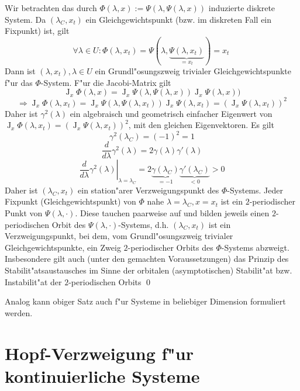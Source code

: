 \documentclass[a4paper, 13pt]{scrreprt}
\theoremstyle{definition} \newtheorem{definition}{Definition}[section]
\newenvironment{beweis}[1][Beweis]{\begin{trivlist}
\item[\hskip \labelsep {\bfseries #1}]}{\end{trivlist}}
\begin{document}
\begin{beweis}
Wir betrachten das durch $\Phi(\lambda,x):=\Psi(\lambda,\Psi(\lambda,x))$ induzierte diskrete System. Da $(\lambda_C, x_t)$ ein Gleichgewichtspunkt (bzw. im diskreten Fall ein Fixpunkt) ist, gilt
\[\forall\lambda\in U: \Phi(\lambda,x_t)=\Psi(\lambda,\underbrace{\Psi(\lambda,x_t)}_{=x_t})=x_t\ \]
Dann ist $(\lambda,x_t), \lambda\in U$ ein Grundl"osungszweig trivialer Gleichgewichtspunkte f"ur das $\Phi$-System. F"ur die Jacobi-Matrix gilt
\[\operatorname{J}_x\Phi(\lambda,x)=\operatorname{J}_x\Psi(\lambda,\Psi(\lambda,x))\operatorname{J}_x\Psi(\lambda,x))\]
\[\Rightarrow \operatorname{J}_x\Phi(\lambda,x_t)=\operatorname{J}_x\Psi(\lambda,\Psi(\lambda,x_t))\operatorname{J}_x\Psi(\lambda,x_t)=(\operatorname{J}_x\Psi(\lambda,x_t))^2\]
Daher ist $\gamma^2(\lambda)$ ein algebraisch und geometrisch einfacher Eigenwert von $\operatorname{J}_x\Phi(\lambda,x_t)=(\operatorname{J}_x\Psi(\lambda,x_t))^2$, mit den gleichen Eigenvektoren.
Es gilt
\[\gamma^2(\lambda_C)=(-1)^2=1\]
\[\frac d {d\lambda}\gamma^2(\lambda)=2\gamma(\lambda)\gamma'(\lambda)\]
\[\left. \frac d {d\lambda}\gamma^2(\lambda)\right |_{\lambda=\lambda_C}=2\underbrace{\gamma(\lambda_C)}_{=-1}\underbrace{\gamma'(\lambda_C)}_{<0}>0\]
Daher ist $(\lambda_C,x_t)$ ein station"arer Verzweigungspunkt des $\Phi$-Systems. Jeder Fixpunkt (Gleichgewichtspunkt) von $\Phi$ nahe $\lambda=\lambda_C, x=x_t$ ist ein $2$-periodischer Punkt von $\Psi(\lambda,\cdot)$. Diese tauchen paarweise auf und bilden jeweils einen $2$-periodischen Orbit des $\Psi(\lambda,\cdot)$-Systems, d.h. $(\lambda_C,x_t)$ ist ein Verzweigungspunkt, bei dem, vom Grundl"osungszweig trivialer Gleichgewichtspunkte, ein Zweig $2$-periodischer Orbits des $\Phi$-Systems abzweigt. Insbesondere gilt auch (unter den gemachten Voraussetzungen) das Prinzip des Stabilit"atsaustausches im Sinne der orbitalen (asymptotischen) Stabilit"at bzw. Instabilit"at der $2$-periodischen Orbits
\qed
\end{beweis}
Analog kann obiger Satz auch f"ur Systeme in beliebiger Dimension formuliert werden.


\section{Hopf-Verzweigung f"ur kontinuierliche Systeme}
\end{document}
